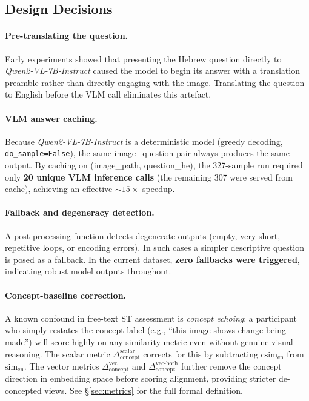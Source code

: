 \documentclass[12pt,a4paper]{article}
\newcommand{\simEN}{\ensuremath{\mathrm{sim}_{\text{en}}}}
\newcommand{\csim}{\ensuremath{\mathrm{csim}_{\text{en}}}}
\newcommand{\SACs}{\ensuremath{\Delta_{\text{concept}}^{\text{scalar}}}}
\newcommand{\SACv}{\ensuremath{\Delta_{\text{concept}}^{\text{vec}}}}
\newcommand{\SACvb}{\ensuremath{\Delta_{\text{concept}}^{\text{vec-both}}}}
\newcommand{\Qwen}{\textit{Qwen2-VL-7B-Instruct}}
\begin{document}
\subsection{Design Decisions}

\paragraph{Pre-translating the question.}
Early experiments showed that presenting the Hebrew question directly to \Qwen{} caused
the model to begin its answer with a translation preamble rather than directly engaging
with the image.  Translating the question to English before the VLM call eliminates
this artefact.

\paragraph{VLM answer caching.}
\label{sec:cache}
Because \Qwen{} is a deterministic model (greedy decoding, \texttt{do\_sample=False}),
the same image+question pair always produces the same output.  By caching on
(image\_path, question\_he), the 327-sample run required only \textbf{20 unique VLM
inference calls} (the remaining 307 were served from cache), achieving an effective
$\sim\!15\times$ speedup.

\paragraph{Fallback and degeneracy detection.}
A post-processing function detects degenerate outputs (empty, very short, repetitive
loops, or encoding errors).  In such cases a simpler descriptive question is posed as
a fallback.  In the current dataset, \textbf{zero fallbacks were triggered}, indicating
robust model outputs throughout.

\paragraph{Concept-baseline correction.}
A known confound in free-text ST assessment is \emph{concept echoing}: a participant
who simply restates the concept label (e.g., ``this image shows change being made'')
will score highly on any similarity metric even without genuine visual reasoning.  The
scalar metric \SACs{} corrects for this by subtracting \csim{} from \simEN{}.
The vector metrics \SACv{} and \SACvb{} further remove the concept direction in
embedding space before scoring alignment, providing stricter de-concepted views.
See \S\ref{sec:metrics} for the full formal definition.
\end{document}
